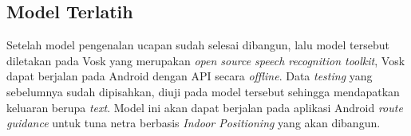 \subsection{Model Terlatih}
Setelah model pengenalan ucapan sudah selesai dibangun, lalu model tersebut diletakan pada Vosk yang merupakan \textit{open source speech recognition toolkit}, Vosk dapat berjalan pada Android dengan API secara \textit{offline}. Data \textit{testing} yang sebelumnya sudah dipisahkan, diuji pada model tersebut sehingga mendapatkan keluaran berupa \textit{text}. Model ini akan dapat berjalan pada aplikasi Android \textit{route guidance} untuk tuna netra berbasis \textit{Indoor Positioning} yang akan dibangun.

